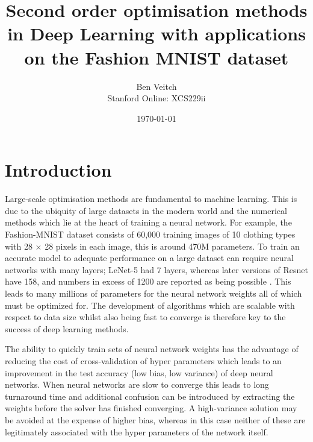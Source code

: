 \documentclass[11pt,twocolumn]{article}
\title{Second order optimisation methods in Deep Learning with applications on the Fashion MNIST dataset}
\author{Ben Veitch \\
Stanford Online: XCS229ii}
\date{\today}
\begin{document}
\maketitle
\begin{abstract}

\end{abstract}

\section{Introduction}
Large-scale optimisation methods are fundamental to machine learning. This is due to the ubiquity of large datasets in the modern world and the numerical methods which lie at the heart of training a neural network.  For example, the Fashion-MNIST dataset \cite{FashionMNIST:data} consists of 60,000 training images of 10 clothing types with 28 $\times$ 28 pixels in each image, this is around 470M parameters. To train an accurate model to adequate performance on a large dataset can require neural networks with many layers; LeNet-5 \cite{LeCun:5} had 7 layers, whereas later versions of Resnet \cite{ResNet_18} have 158, and numbers in excess of 1200 are reported as being possible \cite{Huang:Stoch}. This leads to many millions of parameters for the neural network weights all of which must be optimized for. The development of algorithms which are scalable with respect to data size whilst also being fast to converge is therefore key to the success of deep learning methods.

The ability to quickly train sets of neural network weights has the advantage of reducing the cost of cross-validation of hyper parameters which leads to an improvement in the test accuracy (low bias, low variance) of deep neural networks. When neural networks are slow to converge this leads to long turnaround time and additional confusion can be introduced by extracting the weights before the solver has finished converging. A high-variance solution may be avoided at the expense of higher bias, whereas in this case neither of these are legitimately associated with the hyper parameters of the network itself. 
\end{document}
